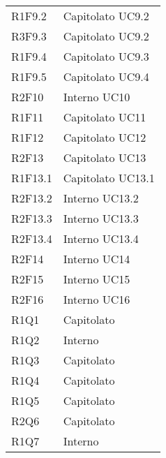 \begin{longtable} {
			>{\centering}p{28mm}  
			>{}p{20mm}
		}
		R1F9.2 & Capitolato UC9.2 \TBstrut \\ [2mm]
		R3F9.3 & Capitolato UC9.2 \TBstrut \\ [2mm]
		R1F9.4 & Capitolato UC9.3 \TBstrut \\ [2mm]
		R1F9.5 & Capitolato UC9.4 \TBstrut \\ [2mm]
		R2F10 & Interno UC10 \TBstrut \\ [2mm]
		R1F11 & Capitolato UC11 \TBstrut \\ [2mm]		
		R1F12 & Capitolato UC12 \TBstrut \\ [2mm]	
		R2F13 & Capitolato UC13 \TBstrut \\ [2mm]		
		R1F13.1 & Capitolato UC13.1 \TBstrut \\ [2mm]		
		R2F13.2 & Interno UC13.2 \TBstrut \\ [2mm]		
		R2F13.3 & Interno UC13.3 \TBstrut \\ [2mm]	
		R2F13.4 & Interno UC13.4 \TBstrut \\ [2mm]	
		R2F14 & Interno UC14 \TBstrut \\ [2mm]		
		R2F15 & Interno UC15 \TBstrut \\ [2mm]		
		R2F16 & Interno UC16 \TBstrut \\ [2mm]	
		
		R1Q1 & Capitolato \TBstrut \\ [2mm]
		R1Q2 & Interno \TBstrut \\ [2mm]
		R1Q3 & Capitolato \TBstrut \\ [2mm]
		R1Q4 & Capitolato \TBstrut \\ [2mm]
		R1Q5 & Capitolato \TBstrut \\ [2mm]
		R2Q6 & Capitolato \TBstrut \\ [2mm]
		R1Q7 & Interno \TBstrut \\ [2mm]
		

\end{longtable}
